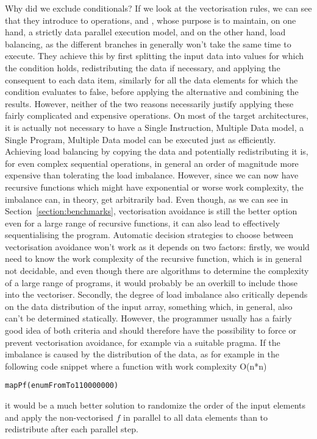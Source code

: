   Why did we exclude conditionals? If we look at the vectorisation rules, we can see that they introduce to operations, \icode@splitPA@ and \icode@combinePA@, whose purpose is to maintain, 
  on one hand, a strictly data parallel execution model, and on the other hand, load balancing, as
  the different branches in generally won't take the same time to execute. They achieve this by
  first splitting the input data into values for which the condition holds, redistributing the 
  data if necessary, and applying the consequent to each data item, similarly for all the data elements for which   the condition evaluates to false, before applying the alternative and combining the results.  However, neither of the two reasons necessarily justify applying these fairly complicated and expensive operations. On most of the target architectures, it is actually not necessary to have a Single Instruction, Multiple Data model, a Single Program, Multiple Data model can be executed just as efficiently. Achieving load balancing by copying the data and 
  potentially redistributing it is, for even complex sequential operations, in general an order of
  magnitude more expensive than tolerating the load imbalance. However, since we can now have recursive functions which might have exponential or worse work complexity, the imbalance can, in
  theory, get arbitrarily bad. Even though, as we can see in Section~\ref{section:benchmarks},
  vectorisation avoidance is still the better option even for a large range of recursive functions, 
  it can also lead to effectively sequentialising the program. Automatic decision strategies to 
  choose between vectorisation avoidance  won't work as it depends on two factors: firstly, we would need to know the work complexity of the recursive function, which is in general not decidable, and
  even though there are algorithms to determine the complexity of a large range of programs, it
  would probably be an overkill to include those into the vectoriser. Secondly, the degree of 
  load imbalance also critically depends on the data distribution of the input array, something
  which, in general, also can't be determined statically. However, the programmer usually has 
  a fairly good idea of both criteria and should therefore have the possibility to force or prevent
  vectorisation avoidance, for example via a suitable pragma. If the imbalance is caused by 
  the distribution of the data, as for example in the following code snippet where a function 
  \icode@f@ with  work complexity O(n*n)

  \begin{alltt}
     mapP f (enumFromTo 1 10000000)
\end{alltt}
   it would be a much better solution to randomize the order of the input elements and apply the
   non-vectorised $f$ in parallel to all data elements than to redistribute after each parallel 
   step.

